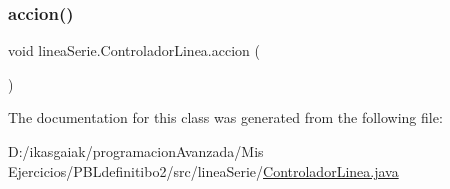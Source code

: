 \subsubsection{\texorpdfstring{accion()}{accion()}}
{\footnotesize\ttfamily void linea\+Serie.\+Controlador\+Linea.\+accion (\begin{DoxyParamCaption}{ }\end{DoxyParamCaption})}



The documentation for this class was generated from the following file\+:\begin{DoxyCompactItemize}
\item 
D\+:/ikasgaiak/programacion\+Avanzada/\+Mis Ejercicios/\+P\+B\+Ldefinitibo2/src/linea\+Serie/\mbox{\hyperlink{_controlador_linea_8java}{Controlador\+Linea.\+java}}\end{DoxyCompactItemize}
